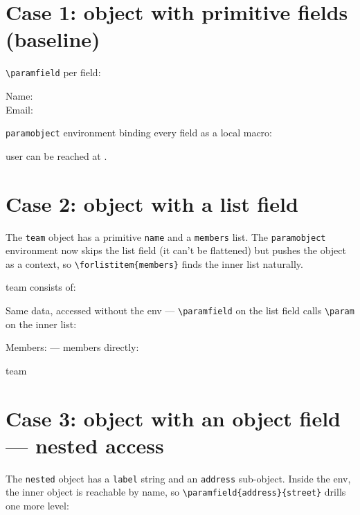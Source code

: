 \documentclass{article}
\begin{document}
    \section*{Case 1: object with primitive fields (baseline)}

    \texttt{\textbackslash paramfield} per field:

    Name: \\
    Email: 

    \medskip

    \texttt{paramobject} environment binding every field as a local macro:

    \begin{paramobject}{user}\name{} can be reached at \email.\end{paramobject}

    \section*{Case 2: object with a list field}

    The \texttt{team} object has a primitive \texttt{name} and a
    \texttt{members} list.  The \texttt{paramobject} environment now
    skips the list field (it can't be flattened) but pushes the object
    as a context, so \texttt{\textbackslash forlistitem\{members\}}
    finds the inner list naturally.

    \newcommand\itemBullet[1]{\textbullet\ #1\quad}
    \begin{paramobject}{team}
        \name{} consists of: 
    \end{paramobject}

    \medskip

    Same data, accessed without the env --- \texttt{\textbackslash paramfield}
    on the list field calls \texttt{\textbackslash param} on the inner list:

    Members:  %
    --- members directly:
    \begin{paramobject}{team}\end{paramobject}

    \section*{Case 3: object with an object field --- nested access}

    The \texttt{nested} object has a \texttt{label} string and an
    \texttt{address} sub-object.  Inside the env, the inner object is
    reachable by name, so \texttt{\textbackslash paramfield\{address\}\{street\}}
    drills one more level:
\end{document}
